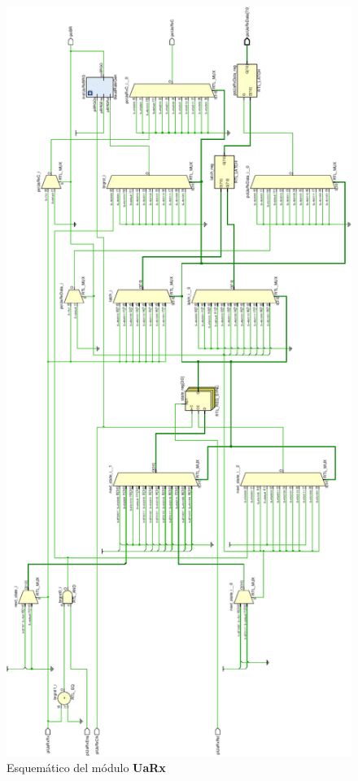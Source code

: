 \documentclass[12pt]{article}
\begin{document}
\begin{figure}[H]
    \includegraphics[angle=270, width=\textwidth]{uart-rx-crop}
    \caption{Esquemático del módulo \textbf{UaRx}}
\end{figure}
\end{document}
